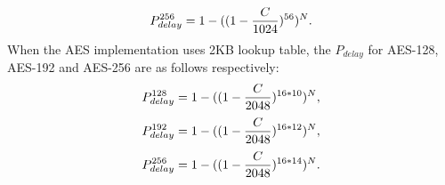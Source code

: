 \begin{equation}
    \scriptsize
    P_{delay}^{256} = 1- ((1-\frac{C}{1024})^{56})^{N}.
\end{equation}
When the AES implementation uses 2KB lookup table, the $P_{delay}$ for AES-128, AES-192 and AES-256 are as follows respectively:
\begin{equation}
    \scriptsize
    P_{delay}^{128} = 1- ((1-\frac{C}{2048})^{16*10})^{N},
\end{equation}
\begin{equation}
    \scriptsize
    P_{delay}^{192} = 1- ((1-\frac{C}{2048})^{16*12})^{N},
\end{equation}
\begin{equation}
    \scriptsize
    P_{delay}^{256} = 1- ((1-\frac{C}{2048})^{16*14})^{N}.
\end{equation}